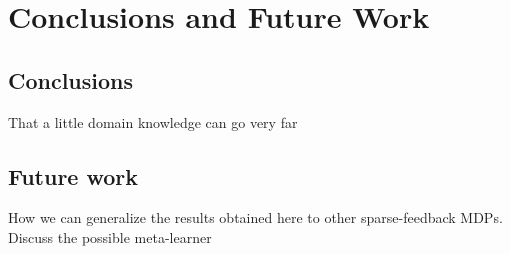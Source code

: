 \chapter{Conclusions and Future Work}
  \section{Conclusions}
  That a little domain knowledge can go very far
  \section{Future work}
  How we can generalize the results obtained here to other sparse-feedback MDPs.
  Discuss the possible meta-learner